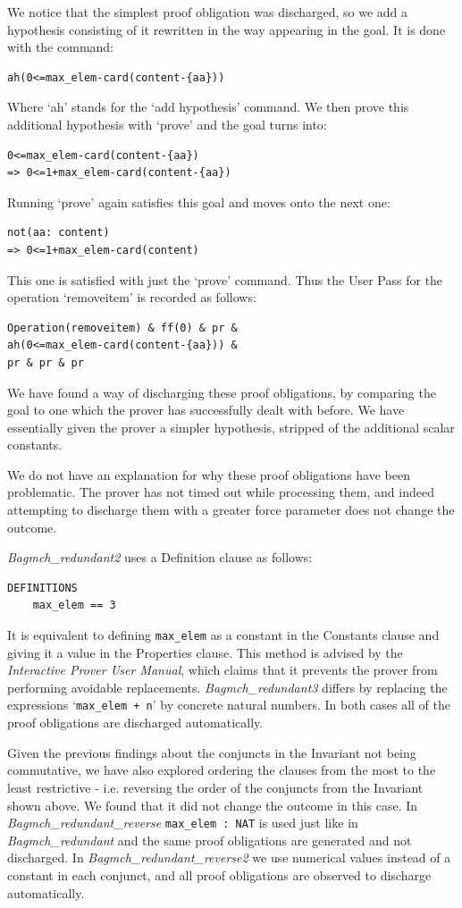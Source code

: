 \documentclass[12pt,journal,duplex]{IEEEtran}
\begin{document}
	We notice that the simplest proof obligation was discharged, so we add a hypothesis consisting of it rewritten in the way appearing in the goal. It is done with the command:
	\begin{lstlisting}
ah(0<=max_elem-card(content-{aa}))
	\end{lstlisting}
	Where `ah' stands for the `add hypothesis' command. We then prove this additional hypothesis with `prove' and the goal turns into:
	\begin{lstlisting}
0<=max_elem-card(content-{aa})
=> 0<=1+max_elem-card(content-{aa})
	\end{lstlisting}
	Running `prove' again satisfies this goal and moves onto the next one:
	\begin{lstlisting}
not(aa: content)
=> 0<=1+max_elem-card(content)
	\end{lstlisting}
	This one is satisfied with just the `prove' command. Thus the User Pass for the operation `removeitem' is recorded as follows:
	\begin{lstlisting}
Operation(removeitem) & ff(0) & pr &
ah(0<=max_elem-card(content-{aa})) &
pr & pr & pr
	\end{lstlisting}
	We have found a way of discharging these proof obligations, by comparing the goal to one which the prover has successfully dealt with before. We have essentially given the prover a simpler hypothesis, stripped of the additional scalar constants.

	We do not have an explanation for why these proof obligations have been problematic. The prover has not timed out while processing them, and indeed attempting to discharge them with a greater force parameter does not change the outcome.

	\emph{Bagmch\_redundant2} uses a Definition clause as follows:
	\begin{lstlisting}
DEFINITIONS
	max_elem == 3
	\end{lstlisting}
	It is equivalent to defining \texttt{max\_elem} as a constant in the Constants clause and giving it a value in the Properties clause. This method is advised by the \emph{Interactive Prover User Manual}, which claims that it prevents the prover from performing avoidable replacements. \emph{Bagmch\_redundant3} differs by replacing the expressions `\texttt{max\_elem + n}' by concrete natural numbers. In both cases all of the proof obligations are discharged automatically.

	Given the previous findings about the conjuncts in the Invariant not being commutative, we have also explored ordering the clauses from the most to the least restrictive - i.e. reversing the order of the conjuncts from the Invariant shown above. We found that it did not change the outcome in this case. In \emph{Bagmch\_redundant\_reverse} \texttt{max\_elem~:~NAT} is used just like in \emph{Bagmch\_redundant} and the same proof obligations are generated and not discharged. In \emph{Bagmch\_redundant\_reverse2} we use numerical values instead of a constant in each conjunct, and all proof obligations are observed to discharge automatically.
\end{document}
